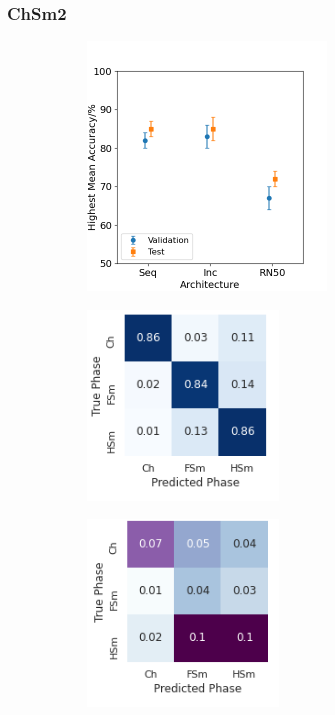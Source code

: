\documentclass[12pt]{article}
\begin{document}
\subsubsection{ChSm2}
\begin{figure}[!h]
\centering
\begin{subfigure}{0.37\textwidth}
	\centering
	\includegraphics[width=2.5in]{images/Graphs/ChSm2.png}
	\caption{}
	\label{chsm2:graph}
\end{subfigure}%
\begin{subfigure}{0.3\textwidth}
	\centering
	\includegraphics[width=2in]{images/ConMats/ChSm2_mean.png}
	\caption{}
	\label{chsm2:mean}
\end{subfigure}%
\begin{subfigure}{0.3\textwidth}
	\centering
	\includegraphics[width=2in]{images/ConMats/ChSm2_std.png}
	\caption{}
	\label{chsm2:std}
\end{subfigure}%
\caption{}
\label{chsm2:chsm2}
\end{figure}
\end{document}
